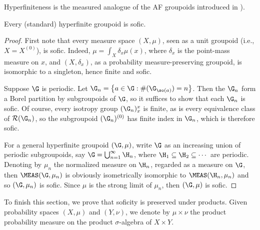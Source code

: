 Hyperfiniteness is the measured analogue of the AF groupoids introduced in \cite{MR584266}).

\begin{corollary}\label{periodicequivalencerelationsaresofic}
Every (standard) hyperfinite groupoid is sofic.
\end{corollary}
\begin{proof}
First note that every measure space $(X,\mu)$, seen as a unit groupoid (i.e., $X=X^{(0)}$), is sofic. Indeed, $\mu=\int_X\delta_x\mu(x)$, where $\delta_x$ is the point-mass measure on $x$, and $(X,\delta_x)$, as a probability measure-preserving groupoid, is isomorphic to a singleton, hence finite and sofic.

Suppose $\G$ is periodic. Let $\G_n=\left\{a\in\G:\#(\G_{\so(a)})=n\right\}$. Then the $\G_n$ form a Borel partition by subgroupoids of $\G$, so it suffices to show that each $\G_n$ is sofic. Of course, every isotropy group $(\G_n)_x^x$ is finite, as is every equivalence class of $\mathcal{R}(\G_n)$, so the subgroupoid $(\G_n)^{(0)}$ has finite index in $\G_n$, which is therefore sofic.

For a general hyperfinite groupoid $(\G,\mu)$, write $\G$ as an increasing union of periodic subgroupoids, say $\G=\bigcup_{n=1}^\infty \H_n$, where $\H_1\subseteq\H_2\subseteq\cdots$ are periodic. Denoting by $\mu_n$ the normalized measure on $\H_n$, regarded as a measure on $\G$, then $\MEAS(\G,\mu_n)$ is obviously isometrically isomorphic to $\MEAS(\H_n,\mu_n)$ and so $(\G,\mu_n)$ is sofic. Since $\mu$ is the strong limit of $\mu_n$, then $(\G,\mu)$ is sofic.\qedhere
\end{proof}

To finish this section, we prove that soficity is preserved under products. Given probability spaces $(X,\mu)$ and $(Y,\nu)$, we denote by $\mu\times\nu$ the product probability measure on the product $\sigma$-algebra of $X\times Y$.

